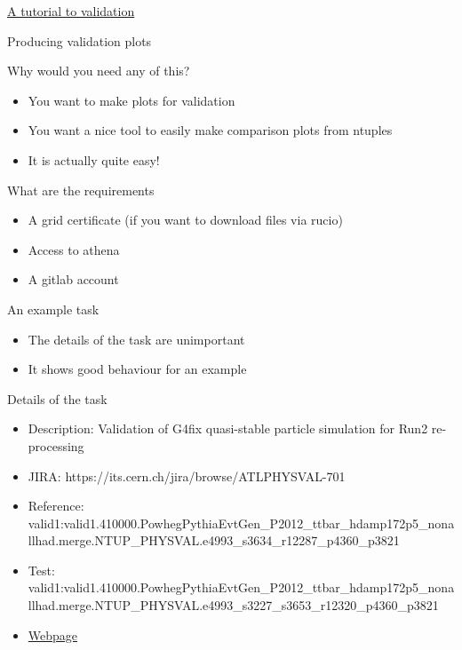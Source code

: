 \begin{frame}
    \centering \href{https://twiki.cern.ch/twiki/bin/viewauth/AtlasProtected/JsvJetPhysicsValidation}{\Huge A tutorial to validation}
\end{frame}

\begin{frame}{Producing validation plots}
    \begin{block}{Why would you need any of this?}
        \begin{itemize}
            \item You want to make plots for validation
            \item You want a nice tool to easily make comparison plots from ntuples
            \item It is actually quite easy!
        \end{itemize}
    \end{block}
    \begin{block}{What are the requirements}
        \begin{itemize}
            \item A grid certificate (if you want to download files via rucio)
            \item Access to athena
            \item A gitlab account
        \end{itemize}
    \end{block}
\end{frame}
%
\begin{frame}{An example task}
   \begin{itemize}
       \item The details of the task are unimportant
       \item It shows good behaviour for an example
   \end{itemize}
   \begin{block}{Details of the task}
       \begin{itemize}
           \item Description: Validation of G4fix quasi-stable particle simulation for Run2 re-processing
           \item JIRA: https://its.cern.ch/jira/browse/ATLPHYSVAL-701
           \item Reference: valid1:valid1.410000.PowhegPythiaEvtGen\_P2012\_ttbar\_hdamp172p5\_nonallhad.merge.NTUP\_PHYSVAL.e4993\_s3634\_r12287\_p4360\_p3821
           \item Test: valid1:valid1.410000.PowhegPythiaEvtGen\_P2012\_ttbar\_hdamp172p5\_nonallhad.merge.NTUP\_PHYSVAL.e4993\_s3227\_s3653\_r12320\_p4360\_p3821
           \item \href{https://atlas-computing.web.cern.ch/atlas-computing/links/PhysValDir/JetEtMiss/exampleValidation_CKIRFEL/}{Webpage}
       \end{itemize}
   \end{block} 
\end{frame}
